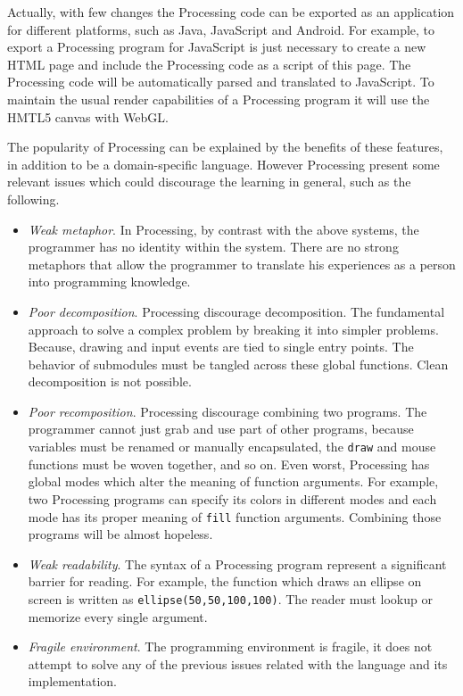 Actually, with few changes the Processing code can be exported as an application for different platforms, such as Java, JavaScript and Android. For example, to export a Processing program for JavaScript is just necessary to create a new HTML page and include the Processing code as a script of this page. The Processing code will be automatically parsed and translated to JavaScript. To maintain the usual render capabilities of a Processing program it will use the HMTL5 canvas with WebGL.

The popularity of Processing can be explained by the benefits of these features, in addition to be a domain-specific language. However Processing present some relevant issues which could discourage the learning in general, such as the following.

\begin{itemize}
  \item \textit{Weak metaphor}. In Processing, by contrast with the above systems, the programmer has no identity within the system. There are no strong metaphors that allow the programmer to translate his experiences as a person into programming knowledge. 

  \item \textit{Poor decomposition}. Processing discourage decomposition. The fundamental approach to solve a complex problem by breaking it into simpler problems. Because, drawing and input events are tied to single entry points. The behavior of submodules must be tangled across these global functions. Clean decomposition is not possible.

  \item \textit{Poor recomposition}. Processing discourage combining two programs. The programmer cannot just grab and use part of other programs, because variables must be renamed or manually encapsulated, the \texttt{draw} and mouse functions must be woven together, and so on. Even worst, Processing has global modes which alter the meaning of function arguments. For example, two Processing programs can specify its colors in different modes and each mode has its proper meaning of \texttt{fill} function arguments. Combining those programs will be almost hopeless. 

  \item \textit{Weak readability}. The syntax of a Processing program represent a significant barrier for reading. For example, the function which draws an ellipse on screen is written as \texttt{ellipse(50,50,100,100)}. The reader must lookup or memorize every single argument. 

  \item \textit{Fragile environment}. The programming environment is fragile, it does not attempt to solve any of the previous issues related with the language and its implementation. 
\end{itemize}

